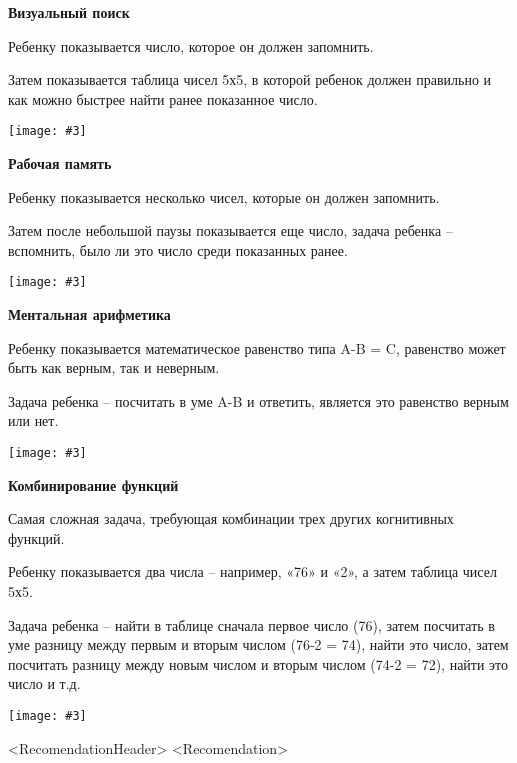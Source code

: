 \documentclass[10pt]{article}
\newcommand{\visualsearch}[3]{
    \begin{center}
        \textbf{\large #1}
    \end{center}

    \vspace{1em}

    #2

    \vspace{1em}

    \texttt{[image: \#3]}
}
\begin{document}
\newpage

\visualsearch{Визуальный поиск}{
Ребенку показывается число, которое он должен запомнить.

\vspace{0.5em}

Затем показывается таблица чисел 5х5, в которой ребенок должен правильно и как можно быстрее найти ранее показанное число.
}{VisualSearch.png}

\vspace{0.5em}

\visualsearch{Рабочая память}{
Ребенку показывается несколько чисел, которые он должен запомнить.

\vspace{0.5em}

Затем после небольшой паузы показывается еще число, задача ребенка – вспомнить, было ли это число среди показанных ранее.
}{WorkingMemory.png}

\newpage

\visualsearch{Ментальная арифметика}{
Ребенку показывается математическое равенство типа A-B = C, равенство может быть как верным, так и неверным.

\vspace{0.5em}

Задача ребенка – посчитать в уме A-B и ответить, является это равенство верным или нет.
}{MentalArithmetic.png}

\vspace{0.5em}

\visualsearch{Комбинирование функций}{
Самая сложная задача, требующая комбинации трех других когнитивных функций.

\vspace{0.5em}

Ребенку показывается два числа – например, «76» и «2», а затем таблица чисел 5х5.

\vspace{0.5em}

Задача ребенка – найти в таблице сначала первое число (76), затем посчитать в уме разницу между первым и вторым числом (76-2 = 74), найти это число, затем посчитать разницу между новым числом и вторым числом (74-2 = 72), найти это число и т.д.
}{CombFunction.png}

\newpage

<RecomendationHeader>
<Recomendation>
\end{document}
